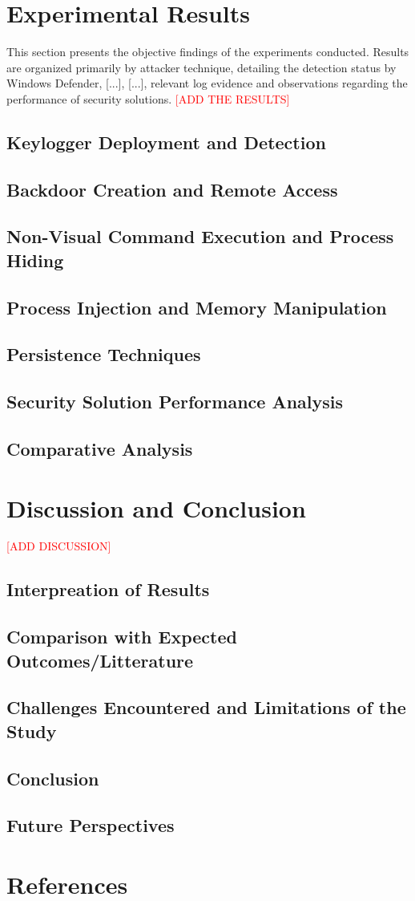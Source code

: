 \documentclass[11pt]{article}
\begin{document}
		\section{Experimental Results}
			This section presents the objective findings of the experiments conducted. Results are organized primarily by attacker technique, detailing the detection status by Windows Defender, [...], [...], relevant log evidence and observations regarding the performance of security solutions.
			\textcolor{red}{[ADD THE RESULTS]}
			\subsection{Keylogger Deployment and Detection}
			\subsection{Backdoor Creation and Remote Access}
			\subsection{Non-Visual Command Execution and Process Hiding}
			\subsection{Process Injection and Memory Manipulation}
			\subsection{Persistence Techniques}
			\subsection{Security Solution Performance Analysis}
			\subsection{Comparative Analysis}
			
		\section{Discussion and Conclusion}
		\textcolor{red}{[ADD DISCUSSION]}
			\subsection{Interpreation of Results}
			\subsection{Comparison with Expected Outcomes/Litterature}
			\subsection{Challenges Encountered and Limitations of the Study}
			\subsection{Conclusion}
			\subsection{Future Perspectives}
			
		\section{References}
		
	
\end{document}
